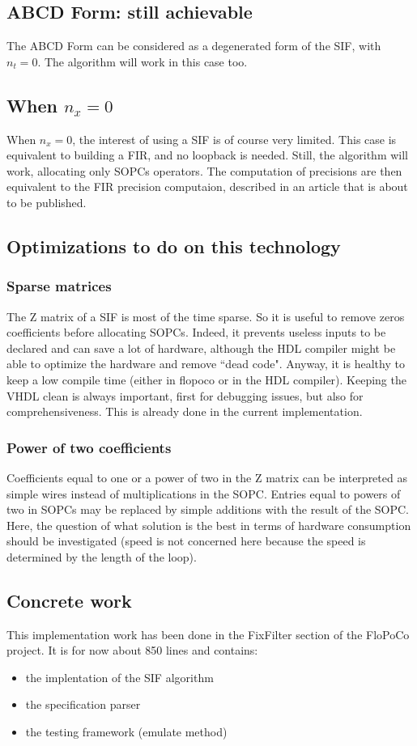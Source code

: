 	\subsection{ABCD Form: still achievable}
	The ABCD Form can be considered as a degenerated form of the SIF, with $n_t=0$.
	The algorithm will work in this case too.
	\subsection{When $n_x=0$}
	When $n_x=0$, the interest of using a SIF is of course very limited.
	This case is equivalent to building a FIR, and no loopback is needed.
	Still, the algorithm will work, allocating only SOPCs operators.
	The computation of precisions are then equivalent to the FIR precision computaion, described in an article that is about to be published.
	
\subsection{Optimizations to do on this technology}
	\subsubsection{Sparse matrices}
		The Z matrix of a SIF is most of the time sparse.
		So it is useful to remove zeros coefficients before allocating SOPCs.
		Indeed, it prevents useless inputs to be declared and can save a lot of hardware,
		although the HDL compiler might be able to optimize the hardware and remove ``dead code".
		Anyway, it is healthy to keep a low compile time (either in flopoco or in the HDL compiler).
		Keeping the VHDL clean is always important, first for debugging issues, but also for comprehensiveness.
		This is already done in the current implementation.

	\subsubsection{Power of two coefficients}
		Coefficients equal to one or a power of two in the Z matrix can be interpreted as simple wires instead of multiplications in the SOPC.
		Entries equal to powers of two in SOPCs may be replaced by simple additions with the result of the SOPC.
		Here, the question of what solution is the best in terms of hardware consumption should be investigated
		(speed is not concerned here because the speed is determined by the length of the loop).

	\subsection{Concrete work}
	This implementation work has been done in the FixFilter section of the FloPoCo project.
	It is for now about 850 lines and contains:
	\begin{itemize}
		\item the implentation of the SIF algorithm
		\item the specification parser
		\item the testing framework (emulate method)
	\end{itemize}

